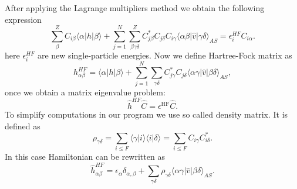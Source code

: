 \documentclass[twoside,english]{uiofysmaster}
\theoremstyle{definition}
\begin{document}
After applying the Lagrange multipliers method we obtain the following expression
\begin{equation}
\sum_{\beta}^Z C_{i\beta}\langle \alpha | h | \beta \rangle+
\sum_{j=1}^N\sum_{\beta\gamma\delta}^Z C^*_{j\beta}C_{j\delta}C_{i\gamma}\langle \alpha\beta|\hat{v}|\gamma\delta\rangle_{AS}=\epsilon_i^{HF}C_{i\alpha}.
\end{equation}
here $\epsilon_i^{HF}$ are new single-particle energies. Now we define Hartree-Fock matrix as
\begin{equation}
h_{\alpha\beta}^{HF}=\langle \alpha | h | \beta \rangle+
\sum_{j=1}^N\sum_{\gamma\delta} C^*_{j\gamma}C_{j\delta}\langle \alpha\gamma|\hat{v}|\beta\delta\rangle_{AS},
\end{equation}
once we obtain a matrix eigenvalue problem:
\begin{equation} \label{eig}
\hat{h}^{HF}\hat{C}=\epsilon^{\mathrm{HF}}\hat{C}.
\end{equation}
To simplify computations in our program we use so called density matrix. It is defined as
\begin{equation} \label{dens}
\rho_{\gamma\delta}=\sum_{i\le F}\langle\gamma|i\rangle\langle i|\delta\rangle = \sum_{i\le F}C_{i\gamma}C^*_{i\delta}.
\end{equation}
In this case Hamiltonian can be rewritten as 
\begin{equation}
\hat{h}_{\alpha\beta}^{HF}=\epsilon_{\alpha}\delta_{\alpha,\beta}+
\sum_{\gamma\delta} \rho_{\gamma\delta}\langle \alpha\gamma|\hat{v}|\beta\delta\rangle_{AS}.
\end{equation}
\end{document}
